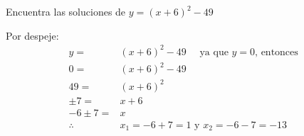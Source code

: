 Encuentra las soluciones de $y=(x+6)^2-49$

\begin{solutionbox}{5cm}
    Por despeje:
    \begin{align*}
        y=         & (x+6)^2-49 \quad \text{ ya que $y=0$, entonces } \\
        0=         & (x+6)^2-49                                       \\
        49=        & (x+6)^2                                          \\
        \pm 7=     & x+6                                              \\
        -6 \pm 7=  & x                                                \\
        \therefore & x_1=-6+7 =1 \text{ y } x_2=-6-7=-13
    \end{align*}
\end{solutionbox}
